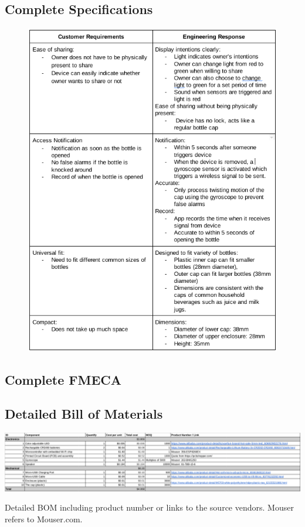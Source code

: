 \documentclass[12pt]{article}
\begin{document}
		\subsection*{Complete Specifications}

	\begin{figure}[H]
	\centering
	\includegraphics[width=\textwidth]{specs.png}
\end{figure}

		\subsection*{Complete FMECA}

	\subsection*{Detailed Bill of Materials}
	\begin{table}[H]
		\includegraphics[width=\textwidth]{bom_large.png}
		
		\caption{Detailed BOM including product number or links to the source vendors. Mouser refers to Mouser.com.
		}
	\end{table}
\end{document}

